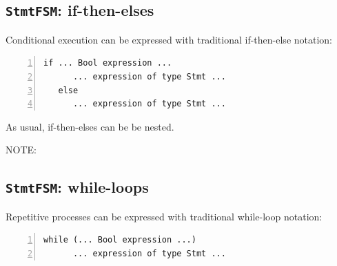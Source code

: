 
\subsection{{\tt StmtFSM}: if-then-elses}


Conditional execution can be expressed with traditional if-then-else notation:

{\small
\begin{Verbatim}[frame=single, numbers=left]
   if ... Bool expression ...
      ... expression of type Stmt ...
   else
      ... expression of type Stmt ...
\end{Verbatim}
}

As usual, if-then-elses can be be nested.

\vspace{2ex}

NOTE:


\subsection{{\tt StmtFSM}: while-loops}


Repetitive processes can be expressed with traditional while-loop notation:

{\small
\begin{Verbatim}[frame=single, numbers=left]
   while (... Bool expression ...)
      ... expression of type Stmt ...
\end{Verbatim}
}


